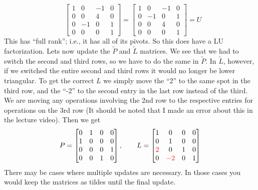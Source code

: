 \documentclass[reqno]{amsart}
\theoremstyle{definition}
\begin{document}
\begin{itemize}
\begin{equation*}
\begin{matrix}
\end{matrix}
\begin{bmatrix}
1 & 0 & -1 & 0\\
0 & 0 & 4 & 0\\
0 & -1 & 0 & 1\\
0 & 0 & 0 & 1
\end{bmatrix} = \begin{bmatrix}
1 & 0 & -1 & 0\\
0 & -1 & 0 & 1\\
0 & 0 & 4 & 0\\
0 & 0 & 0 & 1
\end{bmatrix} = U
\end{equation*}
%
This has ``full rank''; i.e., it has all of its pivots.  So this does have a LU factorization.  Lets now update the $\tilde{P}$ and $\tilde{L}$ matrices.  We see that we had to switch the second and third rows, so we have to do the same in $\tilde{P}$.  In $\tilde{L}$, however, if we switched the entire second and third rows it would no longer be lower triangular.  To get the correct $L$ we simply move the ``2'' to the same spot in the third row, and the ``-2'' to the second entry in the last row instead of the third.  We are moving any operations involving the 2nd row to the respective entries for operations on the 3rd row ({\color{red}It should be noted that I made an error about this in the lecture video}).  Then we get
%
\begin{equation*}
P = \begin{bmatrix}
0 & 1 & 0 & 0\\
1 & 0 & 0 & 0\\
0 & 0 & 0 & 1\\
0 & 0 & 1 & 0
\end{bmatrix},\qquad L = \begin{bmatrix}
1 & 0 & 0 & 0\\
0 & 1 & 0 & 0\\
{\color{red}2} & 0 & 1 & 0\\
0 & {\color{red}-2} & 0 & 1
\end{bmatrix}
\end{equation*}
%
There may be cases where multiple updates are necessary.  In those cases you would keep the matrices as tildes until the final update.

\end{itemize}
\end{document}
